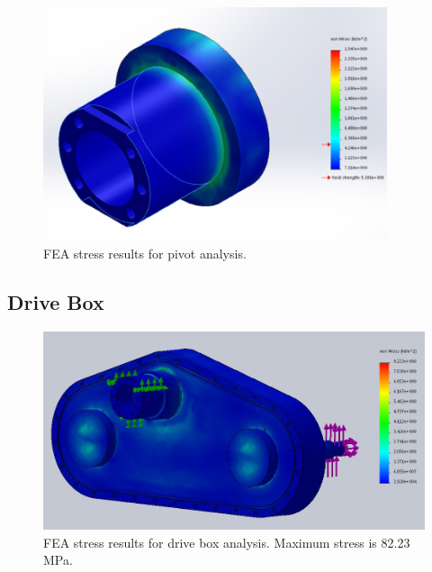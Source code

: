 \begin{figure}[H]
\centering
\includegraphics[width=0.9\textwidth]{images/FEA_pivotold}
\caption[Pivot FEA Stress Results]{FEA stress results for pivot analysis.}
\label{fig:old_pivot_stress_fea}
\end{figure}


\subsection{Drive Box}\label{sec:box_fea}

\begin{figure}[H]
\centering
\includegraphics[width=\textwidth]{images/drive_box_stress_fea}
\caption[Drive Box FEA Stress Results]{FEA stress results for drive box analysis. Maximum stress is 82.23 MPa.}
\label{fig:box_fea1}
\end{figure}

